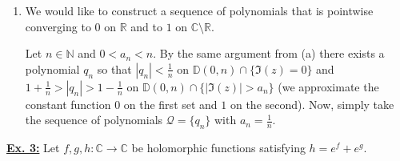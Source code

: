 \documentclass[a4paper, 12pt]{article} %
\newcommand{\D}{\mathbb{D}}
\newcommand{\N}{\mathbb{N}}
\newcommand{\R}{\mathbb{R}}
\newcommand{\C}{\mathbb{C}}
\newcommand{\closure}[1]{\overline{#1}}
\begin{document}
\begin{enumerate}[label=(\alph*)]
	\item We would like to construct a sequence of polynomials that is pointwise converging to $0$ on $\R$ and to $1$ on $\C \setminus \R$.
	
	Let $n \in \N$ and $0 < a_n < n$. By the same argument from (a) there exists a polynomial $q_n$ so that $|q_n| < \frac{1}{n}$ on $\D(0, n)\cap\lbrace\Im(z) = 0\rbrace$ and $1 + \frac{1}{n} > |q_n| > 1 - \frac{1}{n}$ on $\D(0, n)\cap\lbrace|\Im(z)| > a_n \rbrace$ (we approximate the constant function $0$ on the first set and $1$ on the second).
	Now, simply take the sequence of polynomials $\mathcal{Q} = \lbrace q_n\rbrace$ with $a_n = \frac{1}{n}$.
\end{enumerate}

\underline{\textbf{Ex. 3:}}
Let $f, g, h \colon \C \to \C$ be holomorphic functions satisfying $h = e^f + e^g$.
\end{document}
